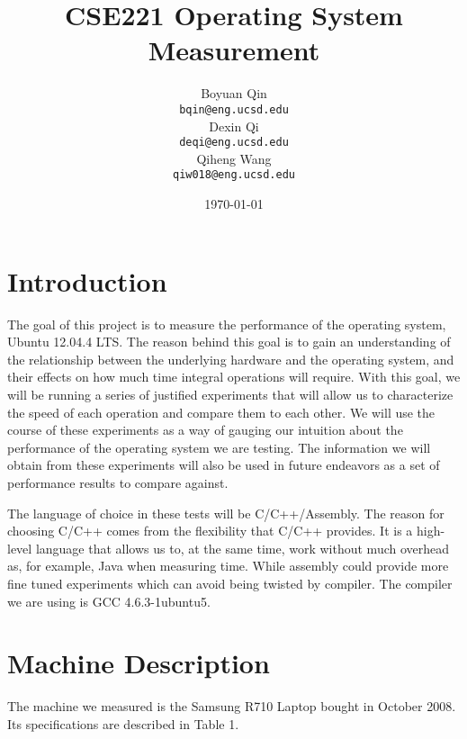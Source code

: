 \documentclass{article} %
\title{CSE221 Operating System Measurement}
\author{
  Boyuan Qin\\
  \texttt{bqin@eng.ucsd.edu}\\
  \And
  Dexin Qi\\
  \texttt{deqi@eng.ucsd.edu}\\
  \And
  Qiheng Wang\\
  \texttt{qiw018@eng.ucsd.edu}\\
}
\date{\today}
\begin{document}
\maketitle

\section{Introduction}
The goal of this project is to measure the performance of the operating
system, Ubuntu 12.04.4 LTS\@.  The reason behind this goal is to gain an
understanding of the relationship between the underlying hardware and the
operating system, and their effects on how much time integral operations will
require.  With this goal, we will be running a series of justified experiments
that will allow us to characterize the speed of each operation and compare
them to each other.  We will use the course of these experiments as a way of
gauging our intuition about the performance of the operating system we are
testing.  The information we will obtain from these experiments will also be
used in future endeavors as a set of performance results to compare against.

The language of choice in these tests will be C/C++/Assembly.  The reason for choosing
C/C++ comes from the flexibility that C/C++ provides. It is a high-level language that allows us to, at the same time, work without much overhead as, for example, Java when measuring time. While assembly could provide more fine tuned experiments which can avoid being twisted by compiler. The compiler we are using is GCC 4.6.3-1ubuntu5.

\section{Machine Description}

The machine we measured is the Samsung R710 Laptop bought in October 2008. Its specifications are described in Table 1.\\
\end{document}
